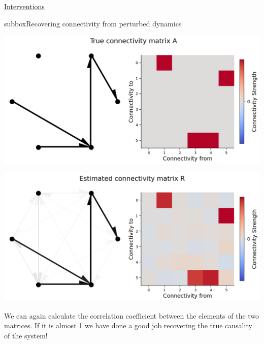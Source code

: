 \begin{textbox}{\href{https://compneuro.neuromatch.io/tutorials/W3D5_NetworkCausality/student/W3D5_Tutorial1.html}{Interventions }   }
\begin{subbox}{subbox}{Recovering connectivity from perturbed dynamics}
\begin{center}
\includegraphics[scale=0.2]{Figures/NC/NC_Figure6.png}
\end{center}
\begin{center}
    
\includegraphics[scale=0.2]{Figures/NC/NC_Figure7.png}
\end{center}
We can again calculate the correlation coefficient between the elements of the two matrices.
If it is almost 1 we have done a good job recovering the true causality of the system!

\end{subbox}
\end{textbox}
\newpage
